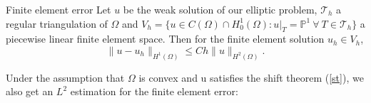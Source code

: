 \documentclass{beamer}
\begin{document}
\begin{frame}{Finite element error}
Let $u$ be the weak solution of our elliptic problem, $\mathcal{T}_h$ a regular triangulation of $\Omega$ and $V_h = \{u \in C(\Omega) \cap H_0^1(\Omega): u|_T = \mathbb{P}^1 \ \forall\ T \in \mathcal{T}_h \}$ a piecewise linear finite element space.
Then for the finite element solution $u_h \in V_h$,
\begin{equation}
	\|u - u_h\|_{H^1(\Omega)} \leq C h \|u\|_{H^2(\Omega)}. \label{fee}
\end{equation}	
	
Under the assumption that $\Omega$ is convex and u satisfies the shift theorem (\ref{st}), we also get an $L^2$ estimation for the finite element error:\\[1ex]

\end{frame}
\end{document}
